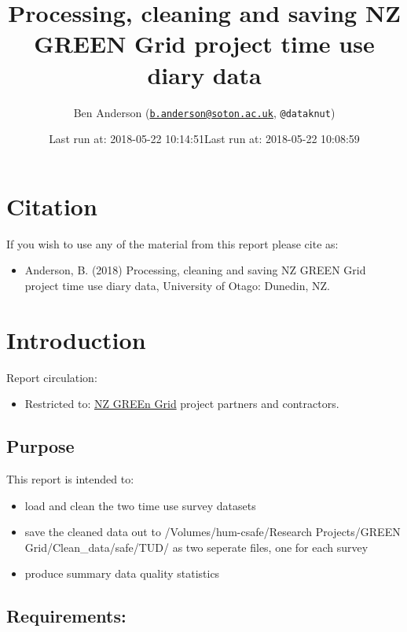 \documentclass[]{article}
\title{Processing, cleaning and saving NZ GREEN Grid project time use diary
data}
\author{Ben Anderson
(\href{mailto:b.anderson@soton.ac.uk}{\nolinkurl{b.anderson@soton.ac.uk}},
\texttt{@dataknut})}
\date{Last run at: 2018-05-22 10:14:51}
\date{Last run at: 2018-05-22 10:08:59}
\providecommand{\tightlist}{%
  \setlength{\itemsep}{0pt}\setlength{\parskip}{0pt}}
\begin{document}
\maketitle

{
\setcounter{tocdepth}{2}
\tableofcontents
}
\newpage

\section{Citation}\label{citation}

If you wish to use any of the material from this report please cite as:

\begin{itemize}
\tightlist
\item
  Anderson, B. (2018) Processing, cleaning and saving NZ GREEN Grid
  project time use diary data, University of Otago: Dunedin, NZ.
\end{itemize}

\newpage

\section{Introduction}\label{introduction}

Report circulation:

\begin{itemize}
\tightlist
\item
  Restricted to:
  \href{https://www.otago.ac.nz/centre-sustainability/research/energy/otago050285.html}{NZ
  GREEn Grid} project partners and contractors.
\end{itemize}

\subsection{Purpose}\label{purpose}

This report is intended to:

\begin{itemize}
\tightlist
\item
  load and clean the two time use survey datasets
\item
  save the cleaned data out to /Volumes/hum-csafe/Research
  Projects/GREEN Grid/Clean\_data/safe/TUD/ as two seperate files, one
  for each survey
\item
  produce summary data quality statistics
\end{itemize}

\subsection{Requirements:}\label{requirements}
\end{document}
